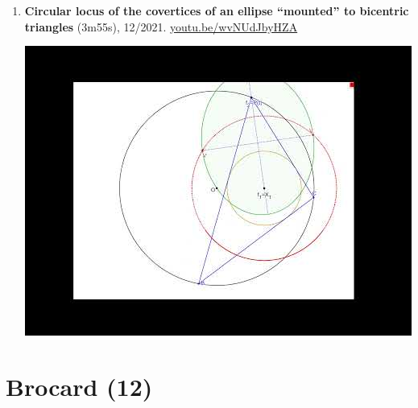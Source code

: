 \documentclass[12pt]{article}
\begin{document}
\begin{enumerate}[resume]
% 
\item \textbf{Circular locus of the covertices of an ellipse ``mounted'' to bicentric triangles} (3m55s), 12/2021. \href{https://youtu.be/wvNUdJbyHZA}{\url{youtu.be/wvNUdJbyHZA}}
\begin{center}\includegraphics[width=.5\textwidth]{pics/wvNUdJbyHZA.jpg}\end{center}
% 
\end{enumerate}

\section{Brocard (12)}
\end{document}
